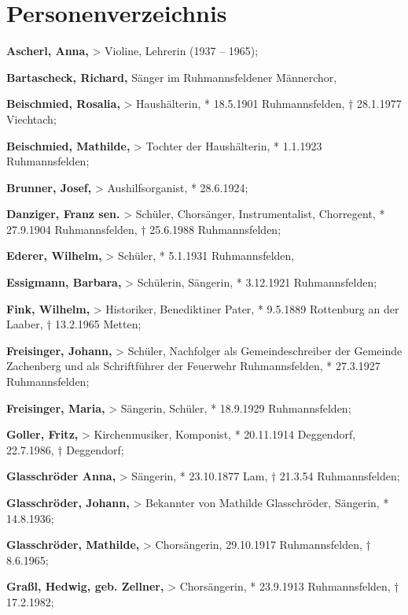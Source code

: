 \section{Personenverzeichnis}

\hypertarget{RefHeadingToc100333759}{}\textbf{Ascherl, Anna,}
{\textgreater} Violine, Lehrerin (1937 – 1965);

\textbf{Bartascheck, Richard, }Sänger im Ruhmannsfeldener Männerchor,

\textbf{Beischmied, Rosalia,} {\textgreater} Haushälterin, * 18.5.1901
Ruhmannsfelden, † 28.1.1977 Viechtach;

\textbf{Beischmied, Mathilde,} {\textgreater} Tochter der Haushälterin,
* 1.1.1923 Ruhmannsfelden;

\textbf{Brunner, Josef, }{\textgreater} Aushilfsorganist, * 28.6.1924;

\textbf{Danziger, Franz sen.} {\textgreater} Schüler, Chorsänger,
Instrumentalist, Chorregent, * 27.9.1904 Ruhmannsfelden, † 25.6.1988
Ruhmannsfelden;

\textbf{Ederer, Wilhelm,} {\textgreater} Schüler, * 5.1.1931
Ruhmannsfelden,

\textbf{Essigmann, Barbara,} {\textgreater} Schülerin, Sängerin, *
3.12.1921 Ruhmannsfelden;

\textbf{Fink, Wilhelm,} {\textgreater} Historiker, Benediktiner Pater, *
9.5.1889 Rottenburg an der Laaber, † 13.2.1965 Metten;

\textbf{Freisinger, Johann,} {\textgreater} Schüler, Nachfolger als
Gemeindeschreiber der Gemeinde Zachenberg und als Schriftführer der
Feuerwehr Ruhmannsfelden, * 27.3.1927 Ruhmannsfelden;

\textbf{Freisinger, Maria,} {\textgreater} Sängerin, Schüler, *
18.9.1929 Ruhmannsfelden;

\textbf{Goller, Fritz, }{\textgreater} Kirchenmusiker, Komponist, *
20.11.1914 Deggendorf, 22.7.1986, † Deggendorf;

\textbf{Glasschröder Anna,} {\textgreater} Sängerin, * 23.10.1877 Lam, †
21.3.54 Ruhmannsfelden;

\textbf{Glasschröder, Johann,} {\textgreater} Bekannter von Mathilde
Glasschröder, Sängerin, * 14.8.1936;

\textbf{Glasschröder, Mathilde,} {\textgreater} Chorsängerin, 29.10.1917
Ruhmannsfelden, † 8.6.1965;

\textbf{Graßl, Hedwig, geb. Zellner,} {\textgreater} Chorsängerin, *
23.9.1913 Ruhmannsfelden, † 17.2.1982;


